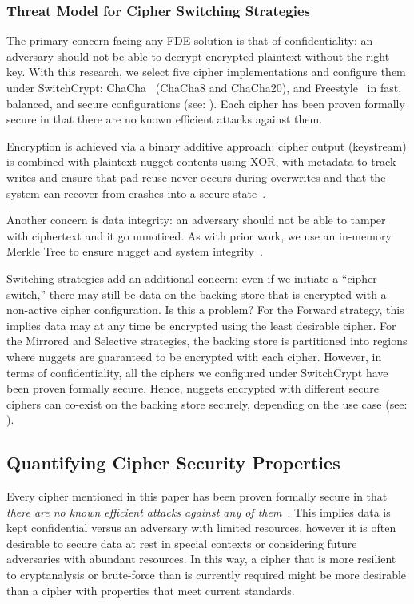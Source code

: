 \subsubsection{Threat Model for Cipher Switching Strategies}

The primary concern facing any FDE solution is that of confidentiality: an
adversary should not be able to decrypt encrypted plaintext without the right
key. With this research, we select five cipher implementations and configure
them under SwitchCrypt: ChaCha~\cite{ChaCha20} (ChaCha8 and ChaCha20), and
Freestyle~\cite{Freestyle} in fast, balanced, and secure configurations (see:
). Each cipher has been proven formally secure in that
there are no known efficient attacks against them.

Encryption is achieved via a binary additive approach: cipher output (keystream)
is combined with plaintext nugget contents using XOR, with metadata to track
writes and ensure that pad reuse never occurs during overwrites and that the
system can recover from crashes into a secure state~\cite{StrongBox}.

Another concern is data integrity: an adversary should not be able to tamper
with ciphertext and it go unnoticed. As with prior work, we use an in-memory
Merkle Tree to ensure nugget and system integrity~\cite{StrongBox}.

Switching strategies add an additional concern: even if we initiate a ``cipher
switch,'' there may still be data on the backing store that is encrypted with a
non-active cipher configuration. Is this a problem? For the Forward strategy,
this implies data may at any time be encrypted using the least desirable cipher.
For the Mirrored and Selective strategies, the backing store is partitioned into
regions where nuggets are guaranteed to be encrypted with each cipher. However,
in terms of confidentiality, all the ciphers we configured under SwitchCrypt
have been proven formally secure. Hence, nuggets encrypted with different secure
ciphers can co-exist on the backing store securely, depending on the use case
(see: ).

\subsection{Quantifying Cipher Security Properties}

Every cipher mentioned in this paper has been proven formally secure in that
\emph{there are no known efficient attacks against any of them}~\cite{All,
Ciphers, Again}. This implies data is kept confidential versus an adversary with
limited resources, however it is often desirable to secure data at rest in
special contexts or considering future adversaries with abundant resources. In
this way, a cipher that is more resilient to cryptanalysis or brute-force than
is currently required might be more desirable than a cipher with properties that
meet current standards.

